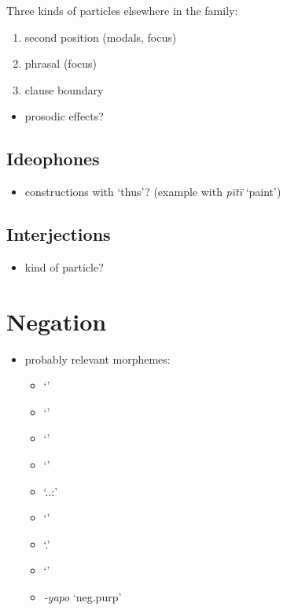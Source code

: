 \documentclass{memoir}
\begin{document}
Three kinds of particles elsewhere in the family:

\begin{enumerate}
\def\labelenumi{\arabic{enumi}.}
\tightlist
\item
  second position (modals, focus)
\item
  phrasal (focus)
\item
  clause boundary
\end{enumerate}

\begin{itemize}
\tightlist
\item
  prosodic effects?
\end{itemize}

\section{Ideophones}

\begin{itemize}
\tightlist
\item
  constructions with  `thus'? (example with \emph{pïtï}
  `paint')
\end{itemize}

\section{Interjections}

\begin{itemize}
\tightlist
\item
  kind of particle?
\end{itemize}

\chapter{\texorpdfstring{Negation \label{negation}}{Negation }}

\begin{itemize}
\tightlist
\item
  probably relevant morphemes:

  \begin{itemize}
  \tightlist
  \item
     `'
  \item
     `'
  \item
     `'
  \item
     `'
  \item
     `..:'
  \item
     `'
  \item
     `.'
  \item
     `'
  \item
    \emph{‑yapo} `neg.purp'
  \end{itemize}
\end{itemize}
\end{document}
